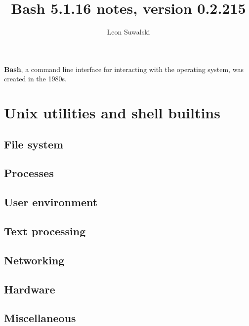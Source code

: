 \documentclass{charun}
\title{Bash 5.1.16 notes, version 0.2.215}
\author{Leon Suwalski}
\begin{document}
\begin{multicols*}{3}
\maketitle
\raggedright

\textbf{Bash}, a command line interface for interacting with the operating system, was created in the 1980s.










\newpage
\section{Unix utilities and shell builtins}
\subsection{File system}


\subsection{Processes}


\subsection{User environment}


\subsection{Text processing}


\subsection{Networking}


\subsection{Hardware}


\subsection{Miscellaneous}


\end{multicols*}
\end{document}
